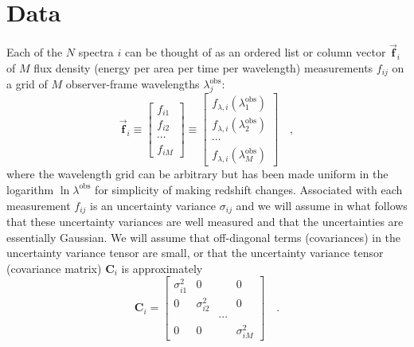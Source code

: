 \documentclass[12pt]{article}
\newcommand{\hoggvector}[1]{\boldsymbol{\vec{#1}}}
\newcommand{\fvec}{\hoggvector{f}}
\newcommand{\hoggmatrix}[1]{\boldsymbol{#1}}
\newcommand{\Cmatrix}{\hoggmatrix{C}}
\begin{document}
\section{Data}

Each of the $N$ spectra $i$ can be thought of as an ordered list or
column vector $\fvec_i$ of $M$ flux density (energy per area per time
per wavelength) measurements $f_{ij}$ on a grid of $M$ observer-frame
wavelengths $\lambda^{\mathrm{obs}}_j$:
\begin{equation}
\fvec_i
\equiv \left[\begin{array}{c} f_{i1} \\
                              f_{i2} \\
                              \cdots \\
                              f_{iM} \end{array}\right]
\equiv \left[\begin{array}{c} f_{\lambda,i}(\lambda^{\mathrm{obs}}_1) \\
                              f_{\lambda,i}(\lambda^{\mathrm{obs}}_2) \\
                                                \cdots \\
                              f_{\lambda,i}(\lambda^{\mathrm{obs}}_M) \end{array}\right]
\quad ,
\end{equation}
where the wavelength grid can be arbitrary but has been made uniform in
the logarithm $\ln\lambda^{\mathrm{obs}}$ for simplicity of making
redshift changes.  Associated with each measurement $f_{ij}$ is an
uncertainty variance $\sigma_{ij}$ and we will assume in what follows
that these uncertainty variances are well measured and that the
uncertainties are essentially Gaussian.  We will assume that
off-diagonal terms (covariances) in the uncertainty variance tensor
are small, or that the uncertainty variance tensor (covariance matrix)
$\Cmatrix_i$ is approximately
\begin{equation}
\Cmatrix_i =
 \left[\begin{array}{cccc} \sigma_{i1}^2 & 0 & & 0 \\
                           0 & \sigma_{i2}^2 & & 0 \\
                           & & \cdots & \\
                           0 & 0 & & \sigma_{iM}^2 \end{array}\right]
\quad .
\end{equation}
\end{document}
